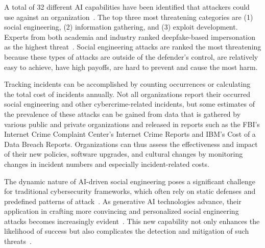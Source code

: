 






%
%
A total of 32 different AI capabilities have been identified that attackers could use against an organization~\citep{mirsky_Threat_Offensive_AI_Organizations_2023}. The top three most threatening categories are (1) social engineering, (2) information gathering, and (3) exploit development. Experts from both academia and industry ranked deepfake-based impersonation as the highest threat~\citep{mirsky_Threat_Offensive_AI_Organizations_2023}. Social engineering attacks are ranked the most threatening because these types of attacks are outside of the defender's control, are relatively easy to achieve, have high payoffs, are hard to prevent and cause the most harm.



Tracking incidents can be accomplished by counting occurrences or calculating the total cost of incidents annually. Not all organizations report their occurred social engineering and other cybercrime-related incidents, but some estimates of the prevalence of these attacks can be gained from data that is gathered by various public and private organizations and released in reports such as the FBI's Internet Crime Complaint Center's Internet Crime Reports and IBM's Cost of a Data Breach Reports. Organizations can thus assess the effectiveness and impact of their new policies, software upgrades, and cultural changes by monitoring changes in incident numbers and especially incident-related costs.







The dynamic nature of AI-driven social engineering poses a significant challenge for traditional cybersecurity frameworks, which often rely on static defenses and predefined patterns of attack~\citep{fakhouri_AI_Driven_Solutions_SE_Attacks_2024}. As generative AI technologies advance, their application in crafting more convincing and personalized social engineering attacks becomes increasingly evident~\citep{blauth_AI_Crime_Overview_Malicious_Use_Abuse_2022}. This new capability not only enhances the likelihood of success but also complicates the detection and mitigation of such threats~\citep{mirsky_Threat_Offensive_AI_Organizations_2023}.



